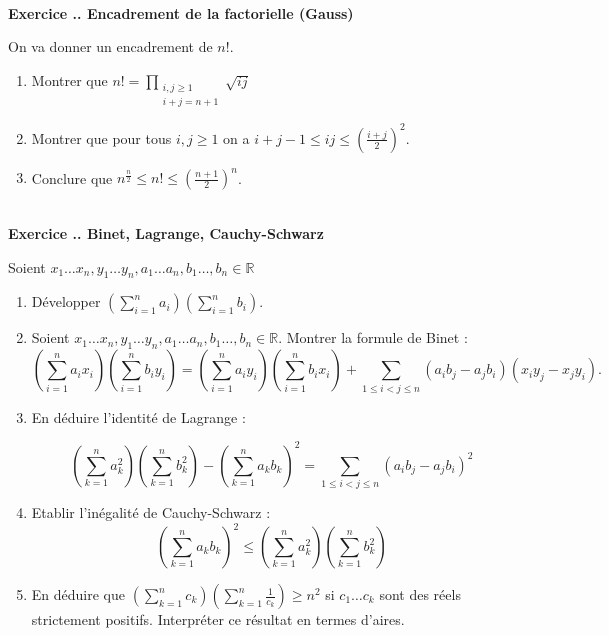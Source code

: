 \documentclass{article}
\newcommand{\mb}[1]{\mathbb{#1}}
\newcounter{exo}
\newcommand{\exercice}[1][\null]{\textbf{\\ Exercice \thesection.\theexo. #1} \addtocounter{exo}{1}}
\begin{document}
\exercice[Encadrement de la factorielle (Gauss)]

On va donner un encadrement de $n !$.

\begin{enumerate}

\item Montrer que $\displaystyle n! = \prod_{\substack{i,j \ge 1\\i+j = n+1}}  \sqrt{ij}$

\item Montrer que pour tous $i,j \ge 1$ on a $i+j-1 \le ij \le (\frac{i+j}{2})^2$.

\item Conclure que $n^{\frac{n}{2}} \le n ! \le (\frac{n+1}{2})^n$.

\end{enumerate}



\exercice[Binet, Lagrange, Cauchy-Schwarz]

Soient $x_1 \dots x_n, y_1 \dots y_n, a_1 \dots a_n, b_1 \dots, b_n \in \mb{R}$

\begin{enumerate}

\item Développer $\displaystyle \left(\sum_{i=1}^n a_i \right)\left(\sum_{i=1}^n b_i \right)$.

\item Soient $x_1 \dots x_n, y_1 \dots y_n, a_1 \dots a_n, b_1 \dots, b_n \in \mb{R}$. Montrer la formule de Binet :
$$ \left(\sum_{i=1}^n a_i x_i\right)\left(\sum_{i=1}^n b_i y_i\right) = \displaystyle \left(\sum_{i=1}^n a_i y_i\right)\left(\sum_{i=1}^n b_i x_i\right) + \sum_{1 \le i < j \le n} (a_i b_j - a_j b_i)(x_i y_j - x_j y_i).$$

\item En déduire l'identité de Lagrange :

$$\displaystyle \left(\sum_{k=1}^n a_k^2\right)\left(\sum_{k=1}^n b_k^2\right) - \left(\sum_{k=1}^n a_k b_k\right)^2 = \sum_{1 \le i < j \le n} (a_i b_j - a_j b_i)^2$$


\item Etablir l'inégalité de Cauchy-Schwarz :
$$\displaystyle \left(\sum_{k=1}^n a_k b_k\right)^2 \le \left(\sum_{k=1}^n a_k^2\right)\left(\sum_{k=1}^n b_k^2\right)$$

\item En déduire que $ \displaystyle \left(\sum_{k=1}^n c_k\right)\left(\sum_{k=1}^n \frac{1}{c_k}\right) \ge n^2$ si $c_1 \dots c_k$ sont des réels strictement positifs. Interpréter ce résultat en termes d'aires.

\end{enumerate}
\end{document}
